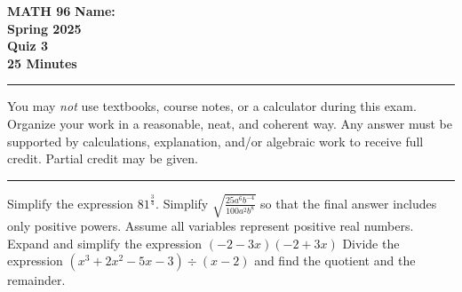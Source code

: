 \documentclass[11pt]{exam}
\begin{document}
\pagestyle{empty}
\textbf{MATH 96}  \textbf{Name:} \makebox[2.77in]{\hrulefill}\\
\textbf{Spring 2025} \\
\textbf{Quiz 3}\\
\textbf{25 Minutes}   

\rule[1ex]{\textwidth}{.1pt}
You may \emph{not} use textbooks, course notes, or a calculator during this exam. Organize your work in a reasonable, neat, and coherent way.  Any answer must be supported by calculations, explanation, and/or algebraic work to receive full credit. Partial credit may be given.
\vspace{5pt}\\
\rule[1ex]{\textwidth}{.1pt}
\noprintanswers
\begin{questions}
\vspace{-10pt}

\question[8] Simplify the expression $81^{\frac{3}{4}}$. 
\vspace{3.1in}
\question[8] Simplify \(\displaystyle \sqrt{ \frac{25a^6b^{-4}}{100a^2b^8} } \) so that the final answer includes only positive powers. Assume all variables represent positive real numbers.
\newpage
\question[6] Expand and simplify the expression $(-2-3x)(-2+3x)$
\vspace{3.1in}
\question[8] Divide the expression $(x^3 + 2x^2 - 5x - 3) \div (x - 2)$ and find the quotient and the remainder.

\end{questions}
\end{document}
